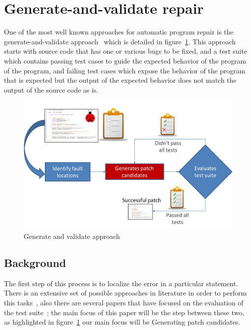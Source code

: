 \documentclass[conference]{IEEEtran}
\begin{document}
\section{Generate-and-validate repair} \label{background}

One of the most well known approaches for automatic program repair is the
generate-and-validate approach~\cite{legoues12} which is detailed in figure~\ref{fig:generateandvalidate}. This approach starts with source code that
has one or various bugs to be fixed, and a test suite which contains passing
test cases to guide the expected behavior of the program of the program, and failing test 
cases which expose the behavior of the program that is expected but the output
of the expected behavior does not match the output of the source code as is.



\begin{figure}[!h]
  \centering
    \includegraphics[scale=0.25]{Picture1}
  \caption{Generate and validate approach}
  \label{fig:generateandvalidate}
\end{figure}

\subsection{Background}
The first step of this process is to localize the error in a particular 
statement. There is an extensive set of possible approaches in literature in 
order to perform this tasks~\cite{Jones05,Jones02,Chen02,legoues12,Qi13}, also there are several papers that have focused on the evaluation of the test suite~\cite{Qi13,fan15}; the main focus of this paper will be the step between these two, as highlighted in figure~\ref{fig:generateandvalidate} our main focus will be Generating patch candidates.
\end{document}
